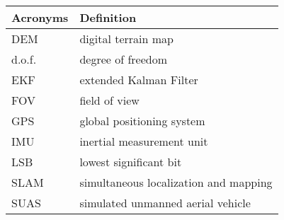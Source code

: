 \begin{center}
\begin{longtable}{ll}
  \hline
  \textbf{Acronyms} & \textbf{Definition} \\
  \hline\hline

DEM     &       digital terrain map\\
d.o.f.  &       degree of freedom \\
EKF     &       extended Kalman Filter \\
FOV	&	field of view	\\
GPS     &       global positioning system \\
IMU     &       inertial measurement unit \\
LSB     &       lowest significant bit  \\
SLAM    &       simultaneous localization and mapping \\
SUAS    &       simulated unmanned aerial vehicle \\

  \hline
\end{longtable}
\end{center}
